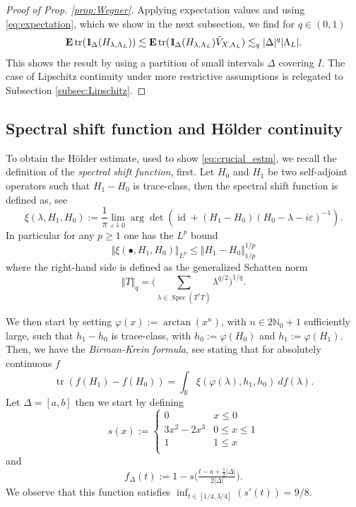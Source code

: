 \documentclass[reqno,12pt,letterpaper]{amsart}
\newcommand{\RR}{{\mathbb R}}
\numberwithin{equation}{section}
\DeclareMathOperator{\Spec}{Spec}
\DeclareMathOperator{\tr}{tr}
\def\indic{\operatorname{1\hskip-2.75pt\relax l}}
\begin{document}
\begin{proof}[Proof of Prop. \ref{prop:Wegner}]
Applying expectation values and using \eqref{eq:expectation}, which we show in the next subsection, we find for $q \in (0,1)$
\begin{equation}
\label{eq:crucial_estm}
\mathbf E \tr(\indic_{\Delta}(H_{\lambda,\Lambda_L})) \lesssim \mathbf E\tr(\indic_{\Delta}(H_{\lambda,\Lambda_L})\tilde V_{X,\Lambda_L} )   \lesssim_q \vert \Delta\vert^{q} \vert \Lambda_L \vert.
\end{equation}
This shows the result by using a partition of small intervals $ \Delta $ covering $I$.
The case of Lipschitz continuity under more restrictive assumptions is relegated to Subsection \ref{subsec:Lipschitz}.
\end{proof}





\subsection{Spectral shift function and H\"older continuity}
\label{sec:Hoelder}
To obtain the H\"older estimate, used to show \eqref{eq:crucial_estm}, we recall the definition of the \emph{spectral shift function}, first.
Let $H_0$ and $H_1$ be two self-adjoint operators such that $H_1-H_0$ is trace-class, then the spectral shift function is defined as, see \cite[Ch. $8$, Sec. $2$, Theo. $1$]{Y92}
\[ \xi(\lambda,H_1,H_0) := \frac{1}{\pi}\lim_{\varepsilon \downarrow 0} \operatorname{arg}\det (\operatorname{id}+(H_1-H_0)(H_0-\lambda-i\varepsilon)^{-1}).\]
In particular for any $p \ge 1$ one has the $L^p$ bound \cite[Theorem $2.1$]{CHN01}
\begin{equation}
\label{eq:Lp}
 \Vert \xi(\bullet, H_1,H_0) \Vert_{L^p} \le \Vert H_1-H_0\Vert_{1/p}^{1/p}
 \end{equation}
where the right-hand side is defined as the generalized Schatten norm $$\Vert T \Vert_q = \Big(\sum_{\lambda \in \Spec(T^*T)} \lambda^{q/2}\Big)^{1/q}.$$

We then start by setting $\varphi(x):=\arctan(x^n)$, with $n \in 2\mathbb N_0+1$ sufficiently large, such that $h_1-h_0$ is trace-class, with $h_0 :=\varphi(H_0)$ and $h_1 :=\varphi(H_1)$. Then, we have the \emph{Birman-Krein formula}, see \cite[Ch.\ 8, Sec.\ 11, Lemma $3$]{Y92} stating that for absolutely continuous $f$
\[ \tr(f(H_1)-f(H_0)) = \int_{\RR}  \xi(\varphi(\lambda),h_1,h_0) \ df(\lambda).\]
Let $\Delta=[a,b]$ then we start by defining 
\[s(x):=\begin{cases}
0           & x \le 0 \\
3x^2 - 2x^3 & 0 \le x \le 1 \\
1           & 1 \le x \\
\end{cases}\]
and 
\begin{equation}
\label{eq:step-func}
f_{\Delta}(t) := 1-s\Bigg(\tfrac{t-a+\tfrac{1}{2}\vert \Delta \vert }{2\vert \Delta \vert}\Bigg).
\end{equation} 
We observe that this function satisfies $\inf_{t \in [1/4,3/4]} (s'(t)) = 9/8$.
\end{document}
